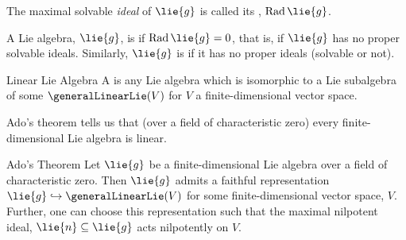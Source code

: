 \documentclass[fleqn]{NotesClass}
\DeclareMathOperator{\Rad}{Rad}
\begin{document}
    \begin{dfn}{}{}
        The maximal solvable \emph{ideal} of \(\lie{g}\) is called its , \(\Rad \lie{g}\).
    \end{dfn}
    
    \begin{dfn}{}{}
        A Lie algebra, \(\lie{g}\), is  if \(\Rad \lie{g} = 0\), that is, if \(\lie{g}\) has no proper solvable ideals.
        Similarly, \(\lie{g}\) is  if it has no proper ideals (solvable or not).
    \end{dfn}
    
    \begin{dfn}{Linear Lie Algebra}{}
        A  is any Lie algebra which is isomorphic to a Lie subalgebra of some \(\generalLinearLie(V)\) for \(V\) a finite-dimensional vector space.
    \end{dfn}
    
    Ado's theorem tells us that (over a field of characteristic zero) every finite-dimensional Lie algebra is linear.
    
    \begin{thm}{Ado's Theorem}{}
        Let \(\lie{g}\) be a finite-dimensional Lie algebra over a field of characteristic zero.
        Then \(\lie{g}\) admits a faithful representation \(\lie{g} \hookrightarrow \generalLinearLie(V)\) for some finite-dimensional vector space, \(V\).
        Further, one can choose this representation such that the maximal nilpotent ideal, \(\lie{n} \subseteq \lie{g}\) acts nilpotently on \(V\).
    \end{thm}
    
\end{document}
